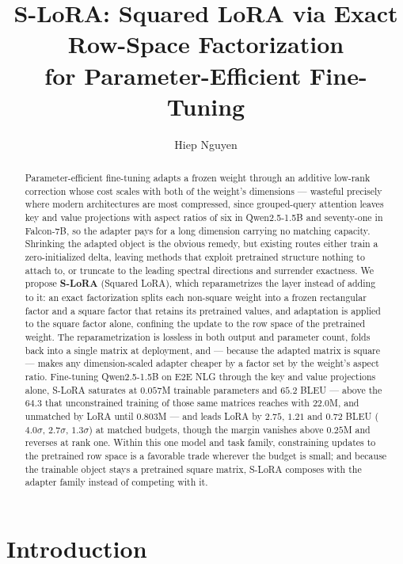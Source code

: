 \documentclass{article}
\title{S-LoRA: Squared LoRA via Exact Row-Space Factorization\\
       for Parameter-Efficient Fine-Tuning}
\author{Hiep Nguyen}
\begin{document}
\maketitle

\begin{abstract}
Parameter-efficient fine-tuning adapts a frozen weight through an additive
low-rank correction whose cost scales with both of the weight's dimensions ---
wasteful precisely where modern architectures are most compressed, since
grouped-query attention leaves key and value projections with aspect ratios of
six in Qwen2.5-1.5B and seventy-one in Falcon-7B, so the adapter pays for a
long dimension carrying no matching capacity. Shrinking the adapted object is
the obvious remedy, but existing routes either train a zero-initialized delta,
leaving methods that exploit pretrained structure nothing to attach to, or
truncate to the leading spectral directions and surrender exactness. We propose
\textbf{S-LoRA} (Squared LoRA), which reparametrizes the layer instead of
adding to it: an exact factorization splits each non-square weight into a
frozen rectangular factor and a square factor that retains its pretrained
values, and adaptation is applied to the square factor alone, confining the
update to the row space of the pretrained weight. The reparametrization is
lossless in both output and parameter count, folds back into a single matrix
at deployment, and --- because the adapted matrix is square --- makes any
dimension-scaled adapter cheaper by a factor set by the weight's aspect ratio.
Fine-tuning Qwen2.5-1.5B on E2E NLG through the key and value projections
alone, S-LoRA saturates at $0.057$M trainable parameters and $65.2$ BLEU ---
above the $64.3$ that unconstrained training of those same matrices reaches
with $22.0$M, and unmatched by LoRA until $0.803$M --- and leads LoRA by
$2.75$, $1.21$ and $0.72$ BLEU ($4.0\sigma$, $2.7\sigma$, $1.3\sigma$) at
matched budgets, though the margin vanishes above $0.25$M and reverses at rank
one. Within this one model and task family, constraining updates to the
pretrained row space is a favorable trade wherever the budget is small; and
because the trainable object stays a pretrained square matrix, S-LoRA composes
with the adapter family instead of competing with it.
\end{abstract}

\section{Introduction}
\end{document}
